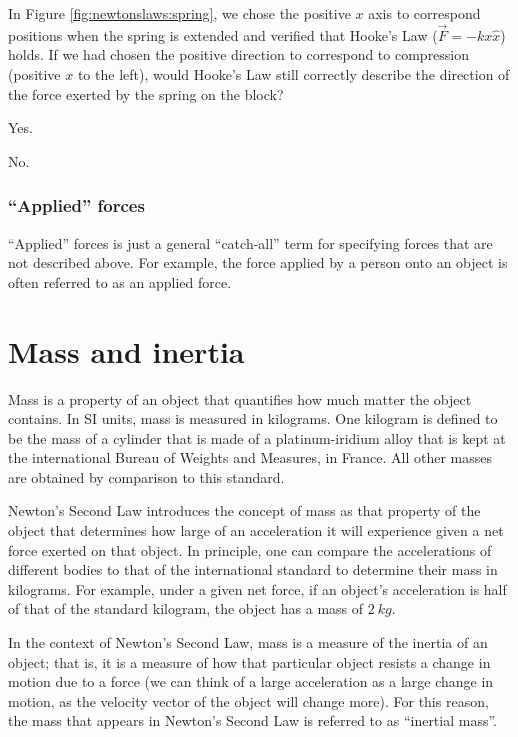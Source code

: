 \begin{checkpointMC}{In Figure \ref{fig:newtonslaws:spring}, we chose the positive $x$ axis to correspond positions when the spring is extended and verified that Hooke's Law ($\vec F=-kx\hat x$) holds. If we had chosen the positive direction to correspond to compression (positive $x$ to the left), would Hooke's Law still correctly describe the direction of the force exerted by the spring on the block?}
\item Yes. %
\item No.
\end{checkpointMC}


\subsubsection{``Applied'' forces}
``Applied'' forces is just a general ``catch-all'' term for specifying forces that are not described above. For example, the force applied by a person onto an object is often referred to as an applied force. 

\section{Mass and inertia}
Mass is a property of an object that quantifies how much matter the object contains. In SI units, mass is measured in kilograms. One kilogram is defined to be the mass of a cylinder that is made of a platinum-iridium alloy that is kept at the international Bureau of Weights and Measures, in France. All other masses are obtained by comparison to this standard. 

Newton's Second Law introduces the concept of mass as that property of the object that determines how large of an acceleration it will experience given a net force exerted on that object. In principle, one can compare the accelerations of different bodies to that of the international standard to determine their mass in kilograms. For example, under a given net force, if an object's acceleration is half of that of the standard kilogram, the object has a mass of $\SI{2}{kg}$. 

In the context of Newton's Second Law, mass is a measure of the inertia of an object; that is, it is a measure of how that particular object resists a change in motion due to a force (we can think of a large acceleration as a large change in motion, as the velocity vector of the object will change more). For this reason, the mass that appears in Newton's Second Law is referred to as ``inertial mass''.

